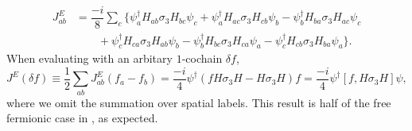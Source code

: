 \documentclass[10pt,nofootinbib]{revtex4}
\begin{document}
		\begin{align}\label{1.2.3}
			J_{ab}^E&=\dfrac{-i}{8}\sum_c\bigg\{\psi_a^\dagger H_{ab}\sigma_3 H_{bc}\psi_c+\psi_a^\dagger H_{ac}\sigma_3 H_{cb}\psi_b-\psi_b^\dagger H_{ba}\sigma_3 H_{ac}\psi_c\nonumber\\
			&\qquad+\psi_c^\dagger H_{ca}\sigma_3 H_{ab}\psi_b-\psi_b^\dagger H_{bc}\sigma_3 H_{ca}\psi_a-\psi_c^\dagger H_{cb}\sigma_3 H_{ba}\psi_a\bigg\}.
		\end{align}
		When evaluating with an arbitary $1$-cochain $\delta f$,
		\begin{equation}\label{1.2.4}
			J^E(\delta f)\equiv\dfrac{1}{2}\sum_{ab}J_{ab}^E(f_a-f_b)=\dfrac{-i}{4}\psi^\dagger(fH\sigma_3 H-H\sigma_3 H)f=\dfrac{-i}{4}\psi^\dagger[f,H\sigma_3H]\psi,
		\end{equation}
		where we omit the summation over spatial labels. This result is half of the free fermionic case in \cite{kapustin2019thermal}, as expected.
\end{document}
